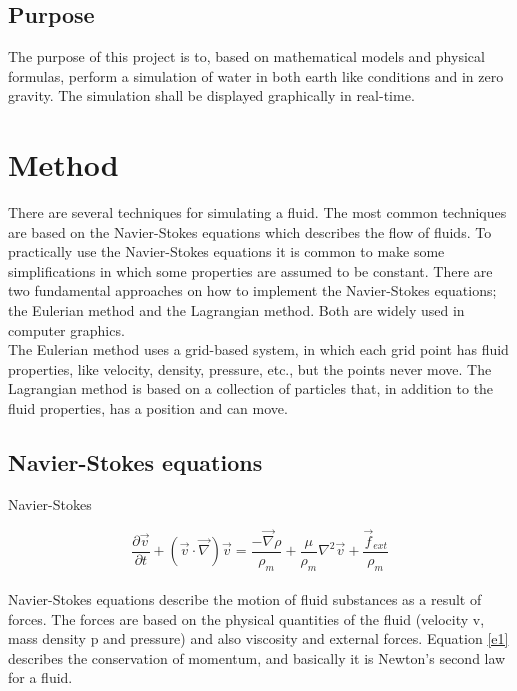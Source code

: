 \documentclass[a4paper,12pt,twoside]{report}
\begin{document}
\section{Purpose}
The purpose of this project is to, based on mathematical models and physical formulas, perform a simulation of water in both earth like conditions and in zero gravity. The simulation shall be displayed graphically in real-time.

\chapter{Method}
There are several techniques for simulating a fluid. The most common techniques are based on the Navier-Stokes equations which describes the flow of fluids. To practically use the Navier-Stokes equations it is common to make some simplifications in which some properties are assumed to be constant. There are two fundamental approaches on how to implement the Navier-Stokes equations; the Eulerian method and the Lagrangian method. Both are widely used in computer graphics. \\

\noindent The Eulerian method uses a grid-based system, in which each grid point has fluid properties, like velocity, density, pressure, etc., but the points never move.
The Lagrangian method is based on a collection of particles that, in addition to the fluid properties, has a position and can move.


\section{Navier-Stokes equations}

Navier-Stokes

\begin{equation}
\frac{\partial \overrightarrow v}{\partial t} + ({\overrightarrow v}\cdot{\overrightarrow \nabla}){\overrightarrow v} = \frac{-\overrightarrow \nabla \rho}{\rho_m} + \frac{\mu}{\rho_m}{ \nabla^2}{\overrightarrow v} + \frac{\overrightarrow f_{ext}}{\rho_m}
\label{e1}
\end{equation} \\

\noindent Navier-Stokes equations describe the motion of fluid substances as a result of forces. The forces are based on the physical quantities of the fluid (velocity v, mass density p and pressure) and also viscosity and external forces. Equation \ref{e1} describes the conservation of momentum, and basically it is Newton’s second law for a fluid.
\end{document}
